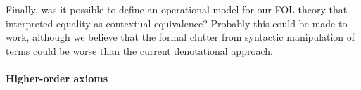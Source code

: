 Finally, was it possible to define an operational model for our FOL theory that interpreted
equality as contextual equivalence? Probably this could be made to work, although we believe
that the formal clutter from syntactic manipulation of terms could be worse than the current
denotational approach. 


\paragraph{Higher-order axioms}



